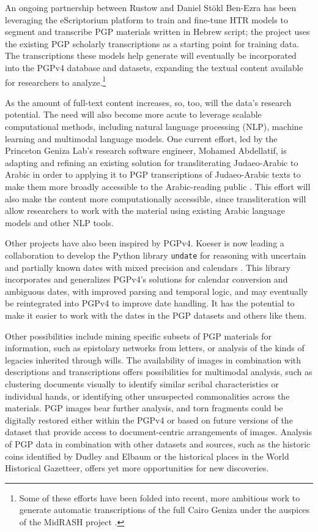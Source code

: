 \documentclass{article}
\begin{document}
An ongoing partnership between Rustow and Daniel Stökl Ben-Ezra \autocite{noauthor_handwritten_nodate, stoekl_ben_ezra_midrash_2026} has been leveraging the eScriptorium platform to train and fine-tune HTR models to segment and transcribe PGP materials written in Hebrew script; the project uses the existing PGP scholarly transcriptions as a starting point for training data. The transcriptions these models help generate will eventually be incorporated into the PGPv4 database and datasets, expanding the textual content available for researchers to analyze.\footnote{Some of these efforts have been folded into recent, more ambitious work to generate automatic transcriptions of the full Cairo Geniza under the auspices of the MidRASH project \autocite{stoekl_ben_ezra_midrash_2025}.}

As the amount of full-text content increases, so, too, will the data’s research potential. The need will also become more acute to leverage scalable computational methods, including natural language processing (NLP), machine learning and multimodal language models. One current effort, led by the Princeton Geniza Lab’s research software engineer, Mohamed Abdellatif, is adapting and refining an existing solution for transliterating Judaeo-Arabic to Arabic \autocite{weisberg_mitelman_code-switching_2024} in order to applying it to PGP transcriptions of Judaeo-Arabic texts to make them more broadly accessible to the Arabic-reading public \autocite{abdellatif_machine_2025}. This effort will also make the content more computationally accessible, since transliteration will allow researchers to work with the material using existing Arabic language models and other NLP tools.

Other projects have also been inspired by PGPv4. Koeser is now leading a collaboration to develop the Python library \texttt{undate} for reasoning with uncertain and partially known dates with mixed precision and calendars \autocite{koeser_undate_2025, koeser_undate_2026}. This library incorporates and generalizes PGPv4’s solutions for calendar conversion and ambiguous dates, with improved parsing and temporal logic, and may eventually be reintegrated into PGPv4 to improve date handling. It has the potential to make it easier to work with the dates in the PGP datasets and others like them.

Other possibilities include mining specific subsets of PGP materials for information, such as epistolary networks from letters, or analysis of the kinds of legacies inherited through wills. The availability of images in combination with descriptions and transcriptions offers possibilities for multimodal analysis, such as clustering documents visually to identify similar scribal characteristics or individual hands, or identifying other unsuspected commonalities across the materials. PGP images bear further analysis, and torn fragments could be digitally restored either within the PGPv4 or based on future versions of the dataset that provide access to document-centric arrangements of images. Analysis of PGP data in combination with other datasets and sources, such as the historic coins identified by Dudley and Elbaum or the historical places in the World Historical Gazetteer, offers yet more opportunities for new discoveries.
\end{document}
